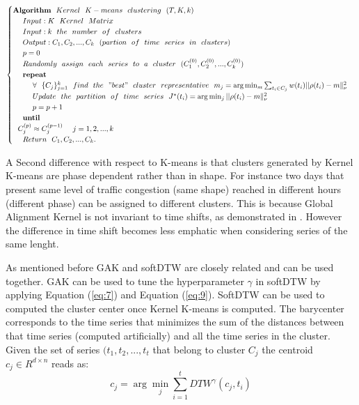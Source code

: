 \documentclass[11pt]{article}
\begin{document}
    \[
\begin{cases}
\textbf{Algorithm} \ \  Kernel \ \ K-means \ \  clustering \ \ (T,K,k) \\
\ \ \ \ Input: K \ \ Kernel \ \ Matrix  \\
 \ \ \ \ Input: k \ \ the \ \ number \ \ of \ \ clusters \\
 \ \ \ \ Output: {C_1, C_2, ..., C_k} \ \ (partion\ \ of\ \ time\ \ series \ \ in \ \ clusters) \\
\ \ \ \ p=0 \\
 \ \ \ \ Randomly \ \ assign\ \ each \ \ series \ \ to \ \ a \ \ cluster \ \ ({C_1^{(0)}, C_2^{(0)}, ..., C_k^{(0)}}) \\ 
 \ \ \ \  \textbf{repeat} \\
  \ \ \ \ \ \ \ \  \forall \ \ \{C_j \}_{j=1}^k \ \ find \ \ the \ \ "best" \ \ cluster \ \ representative \ \ m_j=\arg\min_m \sum_{t_i \in C_j}w(t_i)|| \rho(t_i) - m\|_\mathcal{\nu}^2 \\
   \ \ \ \ \ \ \ \  Update  \ \ the \ \ partition \ \ of \ \ time \ \ series  \ \ J^*(t_i)=\arg\min_j || \rho(t_i) - m\|_\mathcal{\nu}^2 \\
  \ \ \ \ \ \ \ \ p=p+1 \\
     \ \ \ \  \textbf{until} \\ \ \  C_j^{(p)} \approx  C_j^{(p-1)} \ \  \ \ j = 1, 2, ..., k \\
     \ \ \ \  Return \ \ C_1 ,C_2 ,... ,C_k. \\
\end{cases}
\]

    A Second difference with respect to K-means is that clusters generated
by Kernel K-means are phase dependent rather than in shape. For instance
two days that present same level of traffic congestion (same shape)
reached in different hours (different phase) can be assigned to
different clusters. This is because Global Alignment Kernel is not
invariant to time shifts, as demonstrated in \cite{janati2020spatio} .
However the difference in time shift becomes less emphatic when
considering series of the same lenght.

As mentioned before GAK and softDTW are closely related and can be used
together. GAK can be used to tune the hyperparameter \(\gamma\) in
softDTW by applying Equation (\ref{eq:7}) and Equation (\ref{eq:9}).
SoftDTW can be used to computed the cluster center once Kernel K-means
is computed. The barycenter corresponds to the time series that
minimizes the sum of the distances between that time series (computed
artificially) and all the time series in the cluster. Given the set of
series \((t_1, t_2, ..., t_{t}\) that belong to cluster \(C_j\) the
centroid \(c_j\in R^{d \times n}\) reads as: \begin{equation}
\label{eq:12}
c_j=\arg\min_j\sum_{i=1}^{t}DTW^{\gamma}(c_j,t_i) 
\end{equation}
\end{document}
